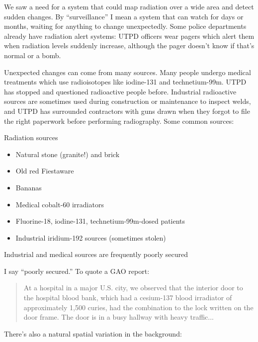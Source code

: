 \documentclass[ignorenonframetext]{beamer}
\begin{document}
We saw a need for a system that could map radiation over a wide area and detect
sudden changes. By ``surveillance'' I mean a system that can watch for days or
months, waiting for anything to change unexpectedly. Some police departments
already have radiation alert systems: UTPD officers wear pagers which alert them
when radiation levels suddenly increase, although the pager doesn't know if
that's normal or a bomb.

Unexpected changes can come from many sources. Many people undergo medical
treatments which use radioisotopes like iodine-131 and technetium-99m. UTPD has
stopped and questioned radioactive people before. Industrial radioactive sources
are sometimes used during construction or maintenance to inspect welds, and UTPD
has surrounded contractors with guns drawn when they forgot to file the right
paperwork before performing radiography. Some common sources:

\begin{frame}{Radiation sources}
  \begin{itemize}
    \item Natural stone (granite!) and brick
    \item Old red Fiestaware
    \item Bananas
    \item Medical cobalt-60 irradiators
    \item Fluorine-18, iodine-131, technetium-99m-dosed patients
    \item Industrial iridium-192 sources (sometimes stolen)
  \end{itemize}
  Industrial and medical sources are frequently poorly secured
\end{frame}

I say ``poorly secured.'' To quote a GAO report:

\begin{quote}
  At a hospital in a major U.S. city, we observed that the interior door to the
  hospital blood bank, which had a cesium-137 blood irradiator of approximately
  1,500 curies, had the combination to the lock written on the door frame. The
  door is in a busy hallway with heavy traffic...
\end{quote}

There's also a natural spatial variation in the background:
\end{document}
